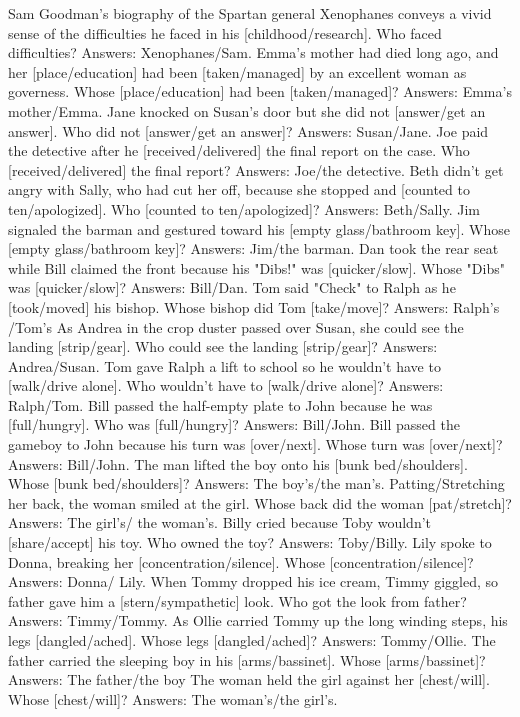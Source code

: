 \begin{foo}
Sam Goodman's biography of the Spartan general Xenophanes conveys a vivid sense of the difficulties he faced in his [childhood/research]. Who faced difficulties? Answers: Xenophanes/Sam.
Emma's mother had died long ago, and her [place/education] had been [taken/managed] by an excellent woman as governess. Whose [place/education] had been [taken/managed]? Answers: Emma's mother/Emma.
Jane knocked on Susan's door but she did not [answer/get an answer]. Who did not [answer/get an answer]? Answers: Susan/Jane.
Joe paid the detective after he [received/delivered] the final report on the case. Who [received/delivered] the final report? Answers: Joe/the detective.
Beth didn't get angry with Sally, who had cut her off, because she stopped and [counted to ten/apologized]. Who [counted to ten/apologized]? Answers: Beth/Sally.
Jim signaled the barman and gestured toward his [empty glass/bathroom key]. Whose [empty glass/bathroom key]? Answers: Jim/the barman.
Dan took the rear seat while Bill claimed the front because his "Dibs!" was [quicker/slow]. Whose "Dibs" was [quicker/slow]? Answers: Bill/Dan.
Tom said "Check" to Ralph as he [took/moved] his bishop. Whose bishop did Tom [take/move]? Answers:  Ralph's /Tom's
As Andrea in the crop duster passed over Susan, she could see the landing [strip/gear]. Who could see the landing [strip/gear]? Answers: Andrea/Susan.
Tom gave Ralph a lift to school so he wouldn't have to [walk/drive alone]. Who wouldn't have to [walk/drive alone]? Answers: Ralph/Tom.
Bill passed the half-empty plate to John because he was [full/hungry]. Who was [full/hungry]? Answers: Bill/John.
Bill passed the gameboy to John because his turn was [over/next]. Whose turn was [over/next]? Answers: Bill/John.
The man lifted the boy onto his [bunk bed/shoulders]. Whose [bunk bed/shoulders]? Answers: The boy's/the man's. 
Patting/Stretching her back, the woman smiled at the girl. Whose back did the woman [pat/stretch]? Answers: The girl's/ the woman's.
Billy cried because Toby wouldn't [share/accept] his toy. Who owned the toy? Answers: Toby/Billy.
Lily spoke to Donna, breaking her [concentration/silence]. Whose [concentration/silence]? Answers: Donna/ Lily.
When Tommy dropped his ice cream, Timmy giggled, so father gave him a [stern/sympathetic] look. Who got the look from father? Answers: Timmy/Tommy.
As Ollie carried Tommy up the long winding steps, his legs [dangled/ached]. Whose legs [dangled/ached]? Answers: Tommy/Ollie.
The father carried the sleeping boy in his [arms/bassinet]. Whose [arms/bassinet]? Answers: The father/the boy
The woman held the girl against her [chest/will]. Whose [chest/will]? Answers: The woman's/the girl's.

\end{foo}
